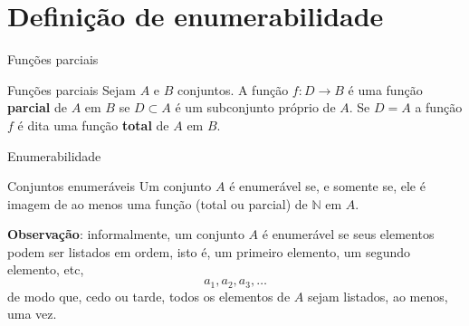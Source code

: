 \section{Definição de enumerabilidade}

\begin{frame}[fragile]{Funções parciais}

    \begin{block}{Funções parciais}
        Sejam $A$ e $B$ conjuntos. A função $f: D\to B$ é uma função \textbf{parcial} de $A$ em 
        $B$ se $D\subset A$ é um subconjunto próprio de $A$. Se $D = A$ a função $f$ é dita uma
        função \textbf{total} de $A$ em $B$.
    \end{block}

\end{frame}

\begin{frame}[fragile]{Enumerabilidade}

    \begin{block}{Conjuntos enumeráveis}
        Um conjunto $A$ é enumerável se, e somente se, ele é imagem de ao menos uma função (total 
        ou parcial) de $\mathbb{N}$ em $A$.
    \end{block}

    \vspace{0.2in}

    \textbf{Observação}: informalmente, um conjunto $A$ é enumerável se seus elementos podem
        ser listados em ordem, isto é, um primeiro elemento, um segundo elemento, etc,
        \[
            a_1, a_2, a_3, \ldots
        \]
        de modo que, cedo ou tarde, todos os elementos de $A$ sejam listados, ao menos, uma vez. 
\end{frame}
